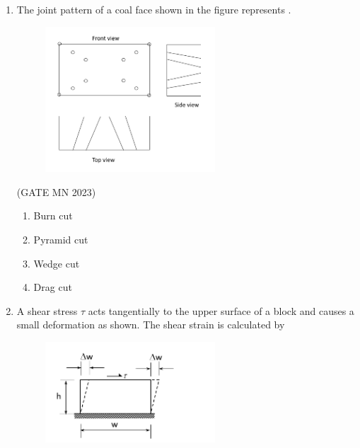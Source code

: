 \documentclass[journal]{IEEEtran}
\begin{document}
\begin{enumerate}
 \item The joint pattern of a coal face shown in the figure represents \underline{\hspace{2cm}}.
    
    \begin{figure}[H]
    \centering
\includegraphics[width=0.6\textwidth]{Screenshot_2025_0822_112141.png}
\caption{}
    \label{fig:Q12}
\end{figure}


\hfill(GATE MN 2023)
    \begin{multicols}{2}
    \begin{enumerate}
        \item Burn cut
        \item Pyramid cut
        \item Wedge cut
        \item Drag cut
    \end{enumerate}
    \end{multicols}
   
\item A shear stress $\tau$ acts tangentially to the upper surface of a block and causes a small deformation as shown. The shear strain is calculated by


    \begin{figure}[H]
    \centering
\includegraphics[width=0.6\textwidth]{Screenshot_2025_0822_113128.png}
\caption{}
    \label{fig:Q13}
\end{figure}



\end{enumerate}
\end{document}
